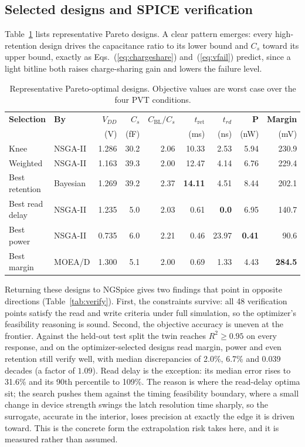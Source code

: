\documentclass[11pt,a4paper]{article}
\newcommand{\Cs}{C_{s}}
\newcommand{\Cbl}{C_{\mathrm{BL}}}
\newcommand{\tret}{t_{\mathrm{ret}}}
\begin{document}
\subsection{Selected designs and SPICE verification}

Table~\ref{tab:designs} lists representative Pareto designs. A clear pattern
emerges: every high-retention design drives the capacitance ratio to its lower
bound and $\Cs$ toward its upper bound, exactly as
Eqs.~(\ref{eq:chargeshare}) and~(\ref{eq:vfail}) predict, since a light bitline
both raises charge-sharing gain and lowers the failure level.

\begin{table}[!ht]
\centering
\caption{Representative Pareto-optimal designs. Objective values are worst case
over the four PVT conditions.}
\label{tab:designs}
\footnotesize
\begin{tabular}{@{}llrrrrrrr@{}}
\toprule
\textbf{Selection} & \textbf{By} & $V_{DD}$ & $\Cs$ & $\Cbl/\Cs$ &
\textbf{$\tret$} & \textbf{$t_{rd}$} & \textbf{P} & \textbf{Margin} \\
 & & (V) & (fF) & & (ms) & (ns) & (nW) & (mV) \\
\midrule
Knee            & NSGA-II  & 1.286 & 30.2 & 2.06 & 10.33 & 2.53  & 5.94  & 230.9 \\
Weighted        & NSGA-II  & 1.163 & 39.3 & 2.00 & 12.47 & 4.14  & 6.76  & 229.4 \\
Best retention  & Bayesian & 1.269 & 39.2 & 2.37 & \textbf{14.11} & 4.51 & 8.44 & 202.1 \\
Best read delay & NSGA-II  & 1.235 & 5.0  & 2.03 & 0.61  & \textbf{0.0} & 6.95 & 140.7 \\
Best power      & NSGA-II  & 0.735 & 6.0  & 2.21 & 0.46  & 23.97 & \textbf{0.41} & 90.6 \\
Best margin     & MOEA/D   & 1.300 & 5.1  & 2.00 & 0.69  & 1.33  & 4.43  & \textbf{284.5} \\
\bottomrule
\end{tabular}
\end{table}

Returning these designs to NGSpice gives two findings that point in opposite
directions (Table~\ref{tab:verify}). First, the constraints survive: all 48
verification points satisfy the read and write criteria under full simulation, so
the optimizer's feasibility reasoning is sound. Second, the objective accuracy is
uneven at the frontier. Against the held-out test split the twin reaches
$R^{2}\ge0.95$ on every response, and on the optimizer-selected designs read margin,
power and even retention still verify well, with median discrepancies of 2.0\%,
6.7\% and 0.039 decades (a factor of $1.09$). Read delay is the exception: its
median error rises to 31.6\% and its 90th percentile to 109\%. The reason is where
the read-delay optima sit; the search pushes them against the timing feasibility
boundary, where a small change in device strength swings the latch resolution time
sharply, so the surrogate, accurate in the interior, loses precision at exactly the
edge it is driven toward. This is the concrete form the extrapolation risk takes
here, and it is measured rather than assumed.
\end{document}
